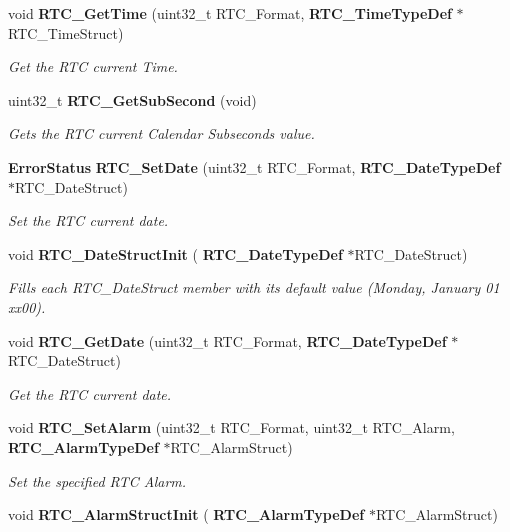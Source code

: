 \begin{DoxyCompactItemize}
void \textbf{ R\+T\+C\+\_\+\+Get\+Time} (uint32\+\_\+t R\+T\+C\+\_\+\+Format, \textbf{ R\+T\+C\+\_\+\+Time\+Type\+Def} $\ast$R\+T\+C\+\_\+\+Time\+Struct)
\begin{DoxyCompactList}\small\item\em Get the R\+TC current Time. \end{DoxyCompactList}\item 
uint32\+\_\+t \textbf{ R\+T\+C\+\_\+\+Get\+Sub\+Second} (void)
\begin{DoxyCompactList}\small\item\em Gets the R\+TC current Calendar Subseconds value. \end{DoxyCompactList}\item 
\textbf{ Error\+Status} \textbf{ R\+T\+C\+\_\+\+Set\+Date} (uint32\+\_\+t R\+T\+C\+\_\+\+Format, \textbf{ R\+T\+C\+\_\+\+Date\+Type\+Def} $\ast$R\+T\+C\+\_\+\+Date\+Struct)
\begin{DoxyCompactList}\small\item\em Set the R\+TC current date. \end{DoxyCompactList}\item 
void \textbf{ R\+T\+C\+\_\+\+Date\+Struct\+Init} (\textbf{ R\+T\+C\+\_\+\+Date\+Type\+Def} $\ast$R\+T\+C\+\_\+\+Date\+Struct)
\begin{DoxyCompactList}\small\item\em Fills each R\+T\+C\+\_\+\+Date\+Struct member with its default value (Monday, January 01 xx00). \end{DoxyCompactList}\item 
void \textbf{ R\+T\+C\+\_\+\+Get\+Date} (uint32\+\_\+t R\+T\+C\+\_\+\+Format, \textbf{ R\+T\+C\+\_\+\+Date\+Type\+Def} $\ast$R\+T\+C\+\_\+\+Date\+Struct)
\begin{DoxyCompactList}\small\item\em Get the R\+TC current date. \end{DoxyCompactList}\item 
void \textbf{ R\+T\+C\+\_\+\+Set\+Alarm} (uint32\+\_\+t R\+T\+C\+\_\+\+Format, uint32\+\_\+t R\+T\+C\+\_\+\+Alarm, \textbf{ R\+T\+C\+\_\+\+Alarm\+Type\+Def} $\ast$R\+T\+C\+\_\+\+Alarm\+Struct)
\begin{DoxyCompactList}\small\item\em Set the specified R\+TC Alarm. \end{DoxyCompactList}\item 
void \textbf{ R\+T\+C\+\_\+\+Alarm\+Struct\+Init} (\textbf{ R\+T\+C\+\_\+\+Alarm\+Type\+Def} $\ast$R\+T\+C\+\_\+\+Alarm\+Struct)

\end{DoxyCompactItemize}
